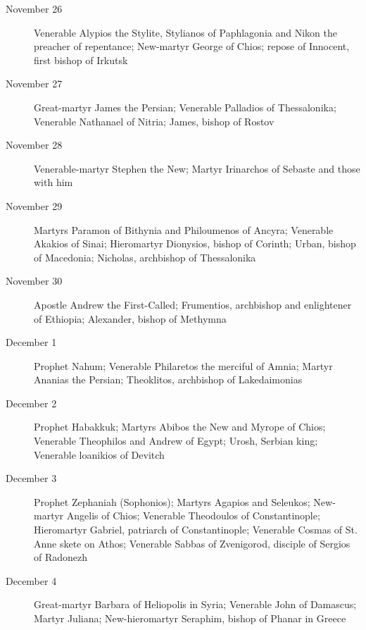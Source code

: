 \begin{description}
\item[November 26]

Venerable Alypios the Stylite, Stylianos of Paphlagonia and Nikon the preacher of repentance; New-martyr George of Chios; repose of Innocent, first bishop of Irkutsk

\item[November 27]

Great-martyr James the Persian; Venerable Palladios of Thessalonika; Venerable Nathanael of Nitria; James, bishop of Rostov

\item[November 28]

Venerable-martyr Stephen the New; Martyr Irinarchos of Sebaste and those with him
\item[November 29]

Martyrs Paramon of Bithynia and Philoumenos of Ancyra; Venerable Akakios of Sinai; Hieromartyr Dionysios, bishop of Corinth; Urban, bishop of Macedonia; Nicholas, archbishop of Thessalonika

\item[November 30]

Apostle Andrew the First-Called; Frumentios, archbishop and enlightener of Ethiopia; Alexander, bishop of Methymna

\item[December 1]

Prophet Nahum; Venerable Philaretos the merciful of Amnia; Martyr Ananias the Persian; Theoklitos, archbishop of Lakedaimonias

\item[December 2]

Prophet Habakkuk; Martyrs Abibos the New and Myrope of Chios; Venerable Theophilos and Andrew of Egypt; Urosh, Serbian king; Venerable loanikios of Devitch

\item[December 3]

Prophet Zephaniah (Sophonios); Martyrs Agapios and Seleukos; New-martyr Angelis of Chios; Venerable Theodoulos of Constantinople; Hieromartyr Gabriel, patriarch of Constantinople; Venerable Cosmas of St. Anne skete on Athos; Venerable Sabbas of Zvenigorod, disciple of Sergios of Radonezh

\item[December 4]

Great-martyr Barbara of Heliopolis in Syria; Venerable John of Damascus; Martyr Juliana; New-hieromartyr Seraphim, bishop of Phanar in Greece


\end{description}
